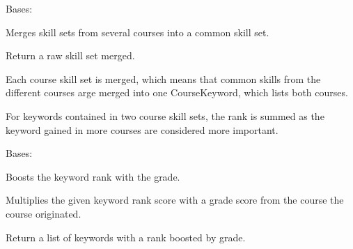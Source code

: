 \documentclass[letterpaper,10pt,english]{sphinxmanual}
\begin{document}

\begin{fulllineitems}
\label{cv_kickstarter:cv_kickstarter.academic_skill_set.CourseSkillSetMerger}
Bases: 

Merges skill sets from several courses into a common skill set.

\begin{fulllineitems}
\label{cv_kickstarter:cv_kickstarter.academic_skill_set.CourseSkillSetMerger.student_skill_set}
Return a raw skill set merged.

Each course skill set is merged, which means that common skills from
the different courses arge merged into one CourseKeyword, which
lists both courses.

For keywords contained in two course skill sets, the rank is summed as
the keyword gained in more courses are considered more important.

\end{fulllineitems}


\end{fulllineitems}


\begin{fulllineitems}
\label{cv_kickstarter:cv_kickstarter.academic_skill_set.KeywordGradeBooster}
Bases: 

Boosts the keyword rank with the grade.

Multiplies the given keyword rank score with a grade score from the course
the course originated.

\begin{fulllineitems}
\label{cv_kickstarter:cv_kickstarter.academic_skill_set.KeywordGradeBooster.boosted_keyword_scores}
Return a list of keywords with a rank boosted by grade.

\end{fulllineitems}


\end{fulllineitems}
\end{document}
